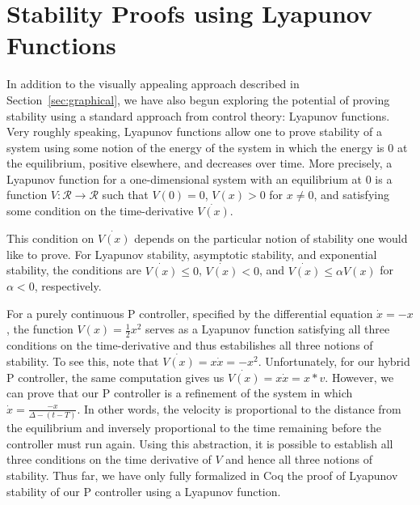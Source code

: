 \documentclass[preprint,nocopyrightspace]{sigplanconf}
\begin{document}



\section{Stability Proofs using Lyapunov Functions}
\label{sec:lyapunov-functions}

In addition to the visually appealing approach described in Section~\ref{sec:graphical}, we have also begun exploring the potential of proving stability using a standard approach from control theory: Lyapunov functions.
Very roughly speaking, Lyapunov functions allow one to prove stability of a system using some notion of the energy of the system in which the energy is 0 at the equilibrium, positive elsewhere, and decreases over time.
More precisely, a Lyapunov function for a one-dimensional system with an equilibrium at 0 is a function $V : \mathcal{R} \rightarrow \mathcal{R}$ such that $V(0) = 0$, $V(x) > 0$ for $x \neq 0$, and satisfying some condition on the time-derivative $\dot{V(x)}$.

This condition on $\dot{V(x)}$ depends on the particular notion of stability one would like to prove.
For Lyapunov stability, asymptotic stability, and exponential stability, the conditions are $\dot{V(x)} \leq 0$, $\dot{V(x)} < 0$, and $\dot{V(x)} \leq \alpha V(x)$ for $\alpha < 0$, respectively.

For a purely continuous P controller, specified by the differential equation $\dot{x} = -x$, the function $V(x) = \frac{1}{2}x^2$ serves as a Lyapunov function satisfying all three conditions on the time-derivative and thus estabilishes all three notions of stability.
To see this, note that $\dot{V(x)} = x\dot{x} = -x^2$.
Unfortunately, for our hybrid P controller, the same computation gives us $\dot{V(x)} = x\dot{x} = x*v$.
However, we can prove that our P controller is a refinement of the system in which $\dot{x} = \frac{-x}{\Delta - (t - T)}$.
In other words, the velocity is proportional to the distance from the equilibrium and inversely proportional to the time remaining before the controller must run again.
Using this abstraction, it is possible to establish all three conditions on the time derivative of $V$ and hence all three notions of stability.
Thus far, we have only fully formalized in Coq the proof of Lyapunov stability of our P controller using a Lyapunov function.
\end{document}
